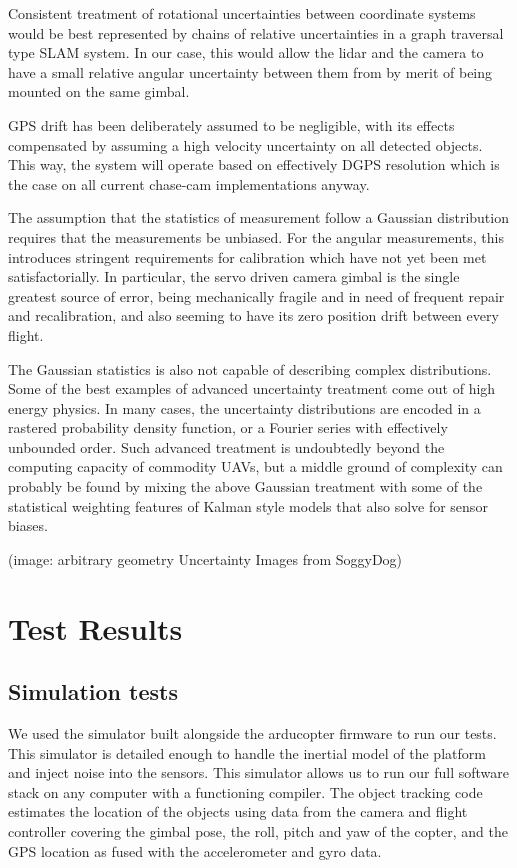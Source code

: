 \documentclass[a4paper, 11pt, titlepage]{article}
\begin{document}
      Consistent treatment of rotational uncertainties between coordinate systems would be best represented by chains of relative uncertainties in a graph traversal type SLAM system.  In our case, this would allow the lidar and the camera to have a small relative angular uncertainty between them from by merit of being mounted on the same gimbal.

      GPS drift has been deliberately assumed to be negligible, with its effects compensated by assuming a high velocity uncertainty on all detected objects.  This way, the system will operate based on effectively DGPS resolution which is the case on all current chase-cam implementations anyway.

      The assumption that the statistics of measurement follow a Gaussian distribution requires that the measurements be unbiased.  For the angular measurements, this introduces stringent requirements for calibration which have not yet been met satisfactorially.  In particular, the servo driven camera gimbal is the single greatest source of error, being mechanically fragile and in need of frequent repair and recalibration, and also seeming to have its zero position drift between every flight.

      The Gaussian statistics is also not capable of describing complex distributions.  Some of the best examples of advanced uncertainty treatment come out of high energy physics.  In many cases, the uncertainty distributions are encoded in a rastered probability density function, or a Fourier series with effectively unbounded order.  Such advanced treatment is undoubtedly beyond the computing capacity of commodity UAVs, but a middle ground of complexity can probably be found by mixing the above Gaussian treatment with some of the statistical weighting features of Kalman style models that also solve for sensor biases.

        (image: arbitrary geometry Uncertainty Images from SoggyDog)

      


\section{Test Results}

  \subsection{Simulation tests}
    We used the simulator built alongside the arducopter firmware to run our tests.  This simulator is detailed enough to handle the inertial model of the platform and inject noise into the sensors.
    This simulator allows us to run our full software stack on any computer with a functioning compiler.
    The object tracking code estimates the location of the objects using data from the camera and flight controller covering the gimbal pose, the roll, pitch and yaw of the copter, and the GPS location as fused with the accelerometer and gyro data.
\end{document}
